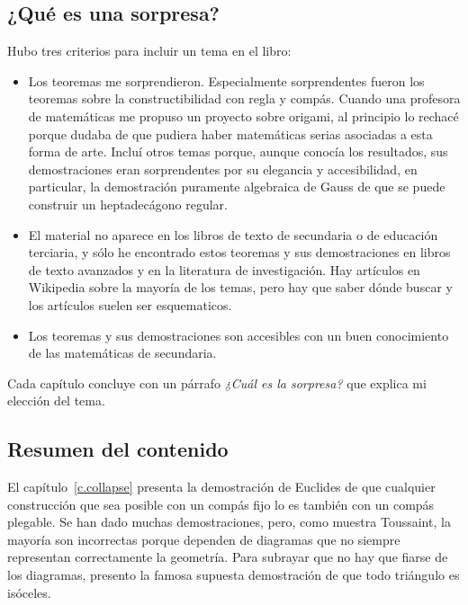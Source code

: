 \subsection*{¿Qué es una sorpresa?}

Hubo tres criterios para incluir un tema en el libro:
\begin{itemize}
\item Los teoremas me sorprendieron. Especialmente sorprendentes fueron los teoremas sobre la constructibilidad con regla y compás. Cuando una profesora de matemáticas me propuso un proyecto sobre origami, al principio lo rechacé porque dudaba de que pudiera haber matemáticas serias asociadas a esta forma de arte.
Incluí otros temas porque, aunque conocía los resultados, sus demostraciones eran sorprendentes por su elegancia y accesibilidad, en particular, la demostración puramente algebraica de Gauss de que se puede construir un heptadecágono regular.

\item El material no aparece en los libros de texto de secundaria o de educación terciaria, y sólo he encontrado estos teoremas y sus demostraciones en libros de texto avanzados y en la literatura de investigación. Hay artículos en Wikipedia sobre la mayoría de los temas, pero hay que saber dónde buscar y los artículos suelen ser esquematicos.

\item Los teoremas y sus demostraciones son accesibles con un buen conocimiento de las matemáticas de secundaria.
\end{itemize}
Cada capítulo concluye con un párrafo \textit{¿Cuál es la sorpresa?} que explica mi elección del tema.

\subsection*{Resumen del contenido}

El capítulo~\ref{c.collapse} presenta la demostración de Euclides de que cualquier construcción que sea posible con un compás fijo lo es también con un compás plegable. Se han dado muchas demostraciones, pero, como muestra Toussaint, la mayoría son incorrectas porque dependen de diagramas que no siempre representan correctamente la geometría. Para subrayar que no hay que fiarse de los diagramas, presento la famosa supuesta demostración de que todo triángulo es isóceles. 

